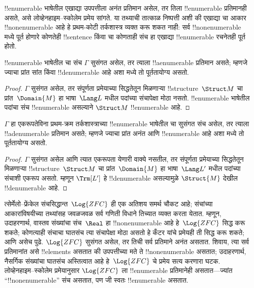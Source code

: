 \documentclass[../../../include/open-logic-section]{subfiles}
\begin{document}

!!{enumerable} भाषेतील एखाद्या उपपत्तीला अनंत प्रतिमान असेल, तर तिला
!!{enumerable} प्रतिमानही असते, असे लोव्हेनहाइम--स्कोलेम प्रमेय सांगते. या
तथ्याची तात्काळ निष्पत्ती अशी की एखाद्या चा आकार
!!{nonenumerable} आहे हे प्रथम-कोटी तर्कशास्त्र व्यक्त करू शकत नाही: सर्व
!!{nonenumerable} मध्ये पूर्त होणारे कोणतेही !!{sentence}
किंवा चा कोणताही संच हा एखाद्या !!{enumerable} रचनेतही
पूर्त होतो.

\begin{thm}
 !!{enumerable} भाषेतील चा संच $\Gamma$ सुसंगत असेल, तर त्याला
!!a{enumerable} प्रतिमान असते; म्हणजे ज्याचा प्रांत सांत किंवा
!!{denumerable} आहे अशा मध्ये तो पूर्ततायोग्य असतो.
\end{thm}

\begin{proof}
$\Gamma$ सुसंगत असेल, तर संपूर्णता प्रमेयाच्या सिद्धतेतून मिळणाऱ्या
!!{structure}~$\Struct M$ चा प्रांत~$\Domain{M}$ हा भाषा~$\Lang L$ मधील
पदांच्या संचापेक्षा मोठा नसतो. !!{enumerable} भाषेतील पदांचा संच !!{enumerable}
असल्याने $\Struct M$ !!{enumerable} आहे.
\end{proof}

\begin{thm}
 $\Gamma$ हा एकरूपतेविना प्रथम-क्रम तर्कशास्त्राच्या
!!{enumerable} भाषेतील चा सुसंगत संच असेल, तर त्याला !!a{denumerable}
प्रतिमान असते; म्हणजे ज्याचा प्रांत अनंत आणि !!{enumerable} आहे अशा
मध्ये तो पूर्ततायोग्य असतो.
\end{thm}

\begin{proof}
$\Gamma$ सुसंगत असेल आणि त्यात एकरूपता येणारी वाक्ये नसतील, तर संपूर्णता
प्रमेयाच्या सिद्धतेतून मिळणाऱ्या !!{structure}~$\Struct M$ चा
प्रांत~$\Domain{M}$ हा भाषा~$\Lang L'$ मधील पदांच्या संचाशी एकरूप असतो.
म्हणून $\Trm[L']$ हे !!{denumerable} असल्यामुळे $\Struct{M}$ देखील
!!{denumerable} आहे.
\end{proof}

\begin{ex}[स्कोलेमची विरोधापत्ती]
त्सेर्मेलो--फ्रेंकेल संचसिद्धान्त~$\Log{ZFC}$ ही एक अतिशय समर्थ चौकट
आहे; संचांच्या आकारांविषयीच्या तथ्यांसह जवळजवळ सर्व गणिती विधाने तिच्यात
व्यक्त करता येतात. म्हणून, उदाहरणार्थ, वास्तव संख्यांचा संच~$\Real$ हा
!!{nonenumerable} आहे हे~$\Log{ZFC}$ सिद्ध करू शकते; कोणत्याही संचाचा
घातसंच त्या संचापेक्षा मोठा असतो हे कँटर यांचे प्रमेयही ती सिद्ध करू शकते;
आणि असेच पुढे. $\Log{ZFC}$ सुसंगत असेल, तर तिची सर्व प्रतिमाने अनंत
असतात. शिवाय, त्या सर्व प्रतिमानांत असे !!{element}s असतात की उपपत्तीच्या
मते ते !!{nonenumerable} असतात; उदाहरणार्थ, नैसर्गिक संख्यांचा घातसंच
अस्तित्वात आहे हे~$\Log{ZFC}$ चे प्रमेय सत्य करणारा घटक. लोव्हेनहाइम--स्कोलेम
प्रमेयानुसार $\Log{ZFC}$ ला !!{enumerable} प्रतिमानेही असतात---ज्यांत
``!!{nonenumerable}'' संच असतात, पण जी स्वतः !!{enumerable} असतात.
\end{ex}
\end{document}
